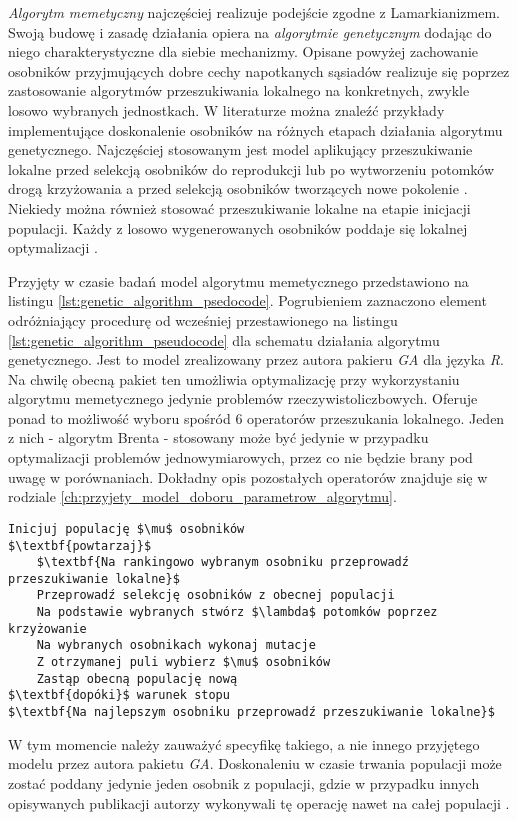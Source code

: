 \par
\emph{Algorytm memetyczny} najczęściej realizuje podejście zgodne z Lamarkianizmem. Swoją budowę i zasadę działania opiera na \emph{algorytmie genetycznym} dodając do niego charakterystyczne dla siebie mechanizmy. Opisane powyżej zachowanie osobników przyjmujących dobre cechy napotkanych sąsiadów realizuje się poprzez zastosowanie algorytmów przeszukiwania lokalnego na konkretnych, zwykle losowo wybranych jednostkach. W literaturze można znaleźć przykłady implementujące doskonalenie osobników na różnych etapach działania algorytmu genetycznego. Najczęściej stosowanym jest model aplikujący przeszukiwanie lokalne przed selekcją osobników do reprodukcji \cite{maringer2006portfolio} lub po wytworzeniu potomków drogą krzyżowania a przed selekcją osobników tworzących nowe pokolenie \cite{sudholt2008computational}. Niekiedy można również stosować przeszukiwanie lokalne na etapie inicjacji populacji. Każdy z losowo wygenerowanych osobników poddaje się lokalnej optymalizacji \cite{elbeltagi2005comparison}.
\par
Przyjęty w czasie badań model algorytmu memetycznego przedstawiono na listingu \ref{lst:genetic_algorithm_psedocode}. Pogrubieniem zaznaczono element odróżniający procedurę od wcześniej przestawionego na listingu \ref{lst:genetic_algorithm_pseudocode} dla schematu działania algorytmu genetycznego. Jest to model zrealizowany przez autora pakieru \emph{GA} dla języka \emph{R}. Na chwilę obecną pakiet ten umożliwia optymalizację przy wykorzystaniu algorytmu memetycznego jedynie problemów rzeczywistoliczbowych. Oferuje ponad to możliwość wyboru spośród 6 operatorów przeszukania lokalnego. Jeden z nich - algorytm Brenta - stosowany może być jedynie w przypadku optymalizacji problemów jednowymiarowych, przez co nie będzie brany pod uwagę w porównaniach. Dokładny opis pozostałych operatorów znajduje się w rodziale \ref{ch:przyjety_model_doboru_parametrow_algorytmu}.  
\begin{lstlisting}[caption=Model algorytmu memetycznego stosowany w pakiecie \emph{GA}, label=lst:memetic_algorithm_pseudocode, mathescape]
Inicjuj populację $\mu$ osobników
$\textbf{powtarzaj}$
    $\textbf{Na rankingowo wybranym osobniku przeprowadź przeszukiwanie lokalne}$
    Przeprowadź selekcję osobników z obecnej populacji
    Na podstawie wybranych stwórz $\lambda$ potomków poprzez krzyżowanie
    Na wybranych osobnikach wykonaj mutacje
    Z otrzymanej puli wybierz $\mu$ osobników
    Zastąp obecną populację nową
$\textbf{dopóki}$ warunek stopu
$\textbf{Na najlepszym osobniku przeprowadź przeszukiwanie lokalne}$
\end{lstlisting}
\par
W tym momencie należy zauważyć specyfikę takiego, a nie innego przyjętego modelu przez autora pakietu \emph{GA}. Doskonaleniu w czasie trwania populacji może zostać poddany jedynie jeden osobnik z populacji, gdzie w przypadku innych opisywanych publikacji autorzy wykonywali tę operację nawet na całej populacji \cite{elbeltagi2005comparison}\cite{sudholt2008computational}\cite{ong2006classification}.

